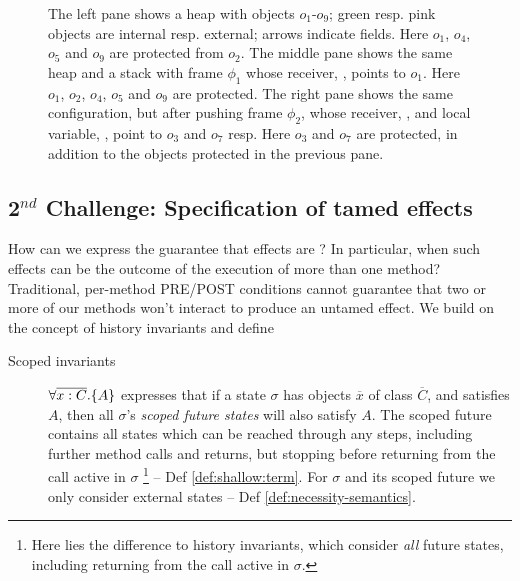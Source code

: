 \begin{figure}[tbh]
{   {The left pane shows a heap with objects $o_1$-$o_9$; green resp. pink objects are internal resp. external;  arrows indicate fields.} 
Here  $o_1$, $o_4$, $o_5$ and $o_9$ 
are protected from $o_2$. 
 The middle pane {shows the same heap and a stack with frame  $\phi_1$} whose receiver,   ,  points to $o_1$. Here 
 $o_1$, $o_2$, $o_4$, $o_5$ and $o_9$  are protected. 
 The right pane {shows the same configuration, but after pushing frame  $\phi_2$}, whose receiver,  ,  and local variable, , point to $o_3$ and  $o_7$ resp.
 Here $o_3$ and $o_7$ are protected, in addition  to  the objects protected in the previous pane. }
   \label{fig:ProtectedBoth}
 \end{figure}
 

\subsection{2$^{nd}$ Challenge: Specification of tamed effects}
\label{sect:approach:scoped}
How can we express the guarantee that effects are \tamed?  
 In particular, when such effects can be the outcome of the execution of more than one method? 
 Traditional,  {per-method} PRE/POST conditions {cannot guarantee} %
  that two or more of our methods won't interact to produce an untamed effect. 
We build on the concept of history invariants \cite{liskov94behavioral,usinghistory,Cohen10} and define

\begin{description}
\item[{Scoped invariants}]  
{$\forall {\overline{x:C}}.{{\{}}{A}{{\}}}$} expresses that if a {state} $\sigma$ 
 has objects $\overline x$ of class $\overline C$, and satisfies $A$, then all $\sigma$'s \emph{scoped  future  states} will  {also} satisfy  {$A$}. 
The scoped future contains all %
 states which can be reached through any steps, including further method calls and returns, but stopping before returning  from the call active in $\sigma$ \footnote{{Here lies the difference to history invariants, which consider \emph{all} future states, including returning from the call active in $\sigma$.}}  --  \cf Def  \ref{def:shallow:term}.
{For} $\sigma$ and its scoped future   we only consider external states -- \cf Def \ref{def:necessity-semantics}.
\end{description}

    
\label{s:bank}



